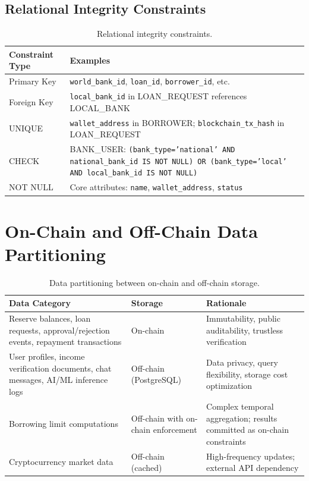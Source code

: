 \documentclass[12pt,a4paper]{report}
\newcommand{\tableheadfont}{\bfseries\small\color{PrimaryBlue}}
\newenvironment{moderntable}[1][H]{%
    \begin{table}[#1]\centering\small%
    \renewcommand{\arraystretch}{1.35}%
}{%
    \end{table}%
}
\begin{document}
\subsection{Relational Integrity Constraints}

\begin{moderntable}
\caption{Relational integrity constraints.}
\begin{tabular}{@{} >{\raggedright}p{2.5cm} >{\raggedright\arraybackslash}p{9.5cm} @{}}
\toprule
\tableheadfont Constraint Type & \tableheadfont Examples \\
\midrule
\rowcolor{RowShade}
Primary Key & \texttt{world\_bank\_id}, \texttt{loan\_id}, \texttt{borrower\_id}, etc. \\
Foreign Key & \texttt{local\_bank\_id} in LOAN\_REQUEST references LOCAL\_BANK \\
\rowcolor{RowShade}
UNIQUE & \texttt{wallet\_address} in BORROWER; \texttt{blockchain\_tx\_hash} in LOAN\_REQUEST \\
CHECK & BANK\_USER: \texttt{(bank\_type='national' AND national\_bank\_id IS NOT NULL) OR (bank\_type='local' AND local\_bank\_id IS NOT NULL)} \\
\rowcolor{RowShade}
NOT NULL & Core attributes: \texttt{name}, \texttt{wallet\_address}, \texttt{status} \\
\bottomrule
\end{tabular}
\end{moderntable}


\section{On-Chain and Off-Chain Data Partitioning}

\begin{moderntable}
\caption{Data partitioning between on-chain and off-chain storage.}
\begin{tabular}{@{} >{\raggedright}p{4.2cm} >{\raggedright}p{2.5cm} >{\raggedright\arraybackslash}p{5.3cm} @{}}
\toprule
\tableheadfont Data Category & \tableheadfont Storage & \tableheadfont Rationale \\
\midrule
\rowcolor{RowShade}
Reserve balances, loan requests, approval/rejection events, repayment transactions & On-chain & Immutability, public auditability, trustless verification \\
User profiles, income verification documents, chat messages, AI/ML inference logs & Off-chain (PostgreSQL) & Data privacy, query flexibility, storage cost optimization \\
\rowcolor{RowShade}
Borrowing limit computations & Off-chain with on-chain enforcement & Complex temporal aggregation; results committed as on-chain constraints \\
Cryptocurrency market data & Off-chain (cached) & High-frequency updates; external API dependency \\
\bottomrule
\end{tabular}
\end{moderntable}
\end{document}
